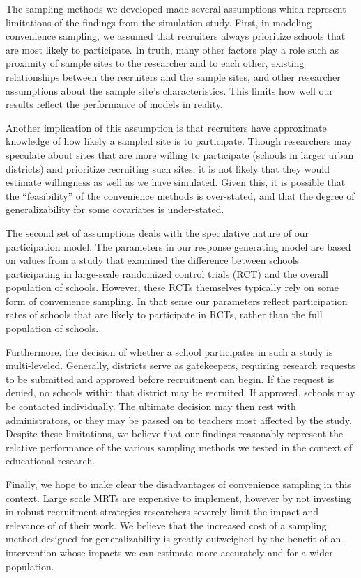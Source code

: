 \documentclass[man,floatsintext]{apa6}
\begin{document}
The sampling methods we developed made several assumptions which represent limitations of the findings from the simulation study. First, in modeling convenience sampling, we assumed that recruiters always prioritize schools that are most likely to participate. In truth, many other factors play a role such as proximity of sample sites to the researcher and to each other, existing relationships between the recruiters and the sample sites, and other researcher assumptions about the sample site's characteristics. This limits how well our results reflect the performance of models in reality.

Another implication of this assumption is that recruiters have approximate knowledge of how likely a sampled site is to participate. Though researchers may speculate about sites that are more willing to participate (schools in larger urban districts) and prioritize recruiting such sites, it is not likely that they would estimate willingness as well as we have simulated. Given this, it is possible that the \enquote{feasibility} of the convenience methods is over-stated, and that the degree of generalizability for some covariates is under-stated.

The second set of assumptions deals with the speculative nature of our participation model. The parameters in our response generating model are based on values from a study that examined the difference between schools participating in large-scale randomized control trials (RCT) and the overall population of schools. However, these RCTs themselves typically rely on some form of convenience sampling. In that sense our parameters reflect participation rates of schools that are likely to participate in RCTs, rather than the full population of schools.

Furthermore, the decision of whether a school participates in such a study is multi-leveled. Generally, districts serve as gatekeepers, requiring research requests to be submitted and approved before recruitment can begin. If the request is denied, no schools within that district may be recruited. If approved, schools may be contacted individually. The ultimate decision may then rest with administrators, or they may be passed on to teachers most affected by the study. Despite these limitations, we believe that our findings reasonably represent the relative performance of the various sampling methods we tested in the context of educational research.

Finally, we hope to make clear the disadvantages of convenience sampling in this context. Large scale MRTs are expensive to implement, however by not investing in robust recruitment strategies researchers severely limit the impact and relevance of of their work. We believe that the increased cost of a sampling method designed for generalizability is greatly outweighed by the benefit of an intervention whose impacts we can estimate more accurately and for a wider population.
\end{document}
